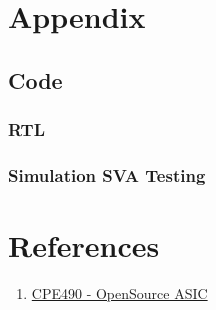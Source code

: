 \documentclass[a4paper]{report}
\begin{document}
	\chapter{Appendix}
		\section{Code}
			\subsection{RTL}
				
				

				

				

			\subsection{Simulation SVA Testing}

				


	\chapter{References}
		\begin{enumerate}
			\item \href{https://github.com/Cal-Poly-Open-Source-ASIC-Class}{CPE490 - OpenSource ASIC}
		\end{enumerate}
		
\end{document}
